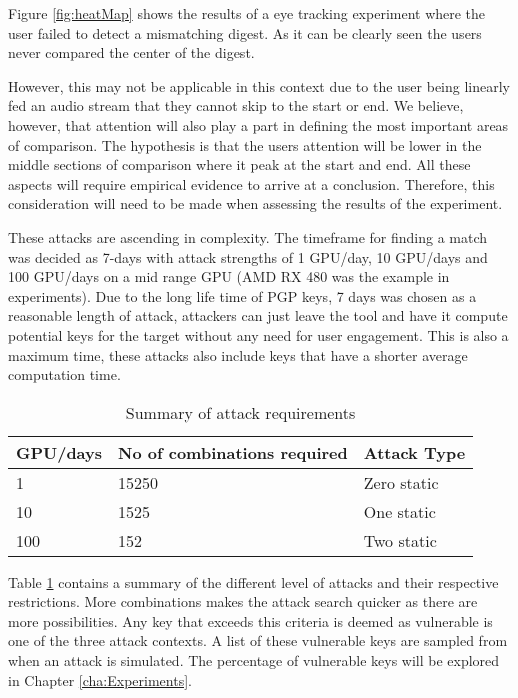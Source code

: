 Figure \ref{fig:heatMap} shows the results of a eye tracking experiment where the user failed to detect a mismatching digest. As it can be clearly seen the users never compared the center of the digest. 

However, this may not be applicable in this context due to the user being linearly fed an audio stream that they cannot skip to the start or end. We believe, however, that attention will also play a part in defining the most important areas of comparison. The hypothesis is that the users attention will be lower in the middle sections of comparison where it peak at the start and end. All these aspects will require empirical evidence to arrive at a conclusion. Therefore, this consideration will need to be made when assessing the results of the experiment.

These attacks are ascending in complexity. The timeframe for finding a match was decided as 7-days with attack strengths of 1 GPU/day, 10 GPU/days and 100 GPU/days on a mid range GPU (AMD RX 480 was the example in experiments). Due to the long life time of PGP keys, 7 days was chosen as a reasonable length of attack, attackers can just leave the tool and have it compute potential keys for the target without any need for user engagement. This is also a maximum time, these attacks also include keys that have a shorter average computation time.


\begin{table}[h!]
    \centering
    \begin{tabular}{lll}
        GPU/days & No of combinations required & Attack Type \\
        \hline
        1       & 15250   & Zero static\\
        10      & 1525    & One static\\
        100     & 152     & Two static\\        
    \end{tabular}
    \caption{Summary of attack requirements}
    \label{tab:attackReq}
\end{table}

Table \ref{tab:attackReq} contains a summary of the different level of attacks and their respective restrictions. More combinations makes the attack search quicker as there are more possibilities. Any key that exceeds this criteria is deemed as vulnerable is one of the three attack contexts. A list of these vulnerable keys are sampled from when an attack is simulated. The percentage of vulnerable keys will be explored in Chapter \ref{cha:Experiments}.

